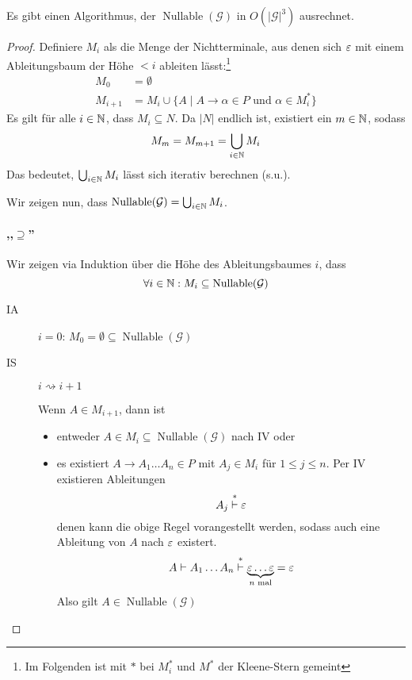 \begin{Satz}
  Es gibt einen Algorithmus, der $\operatorname{Nullable}(\mathcal{G})$ in $O(|\mathcal{G}|^3)$ ausrechnet.
\end{Satz}
\begin{proof}
  Definiere $M_i$ als die Menge der Nichtterminale, aus denen sich
  $\varepsilon$ mit einem Ableitungsbaum der Höhe $< i$ ableiten lässt:\footnote{
  Im Folgenden ist mit $*$ bei $M_i^*$ und $M^*$ der Kleene-Stern gemeint} 
  \begin{align*}
    M_0 &= \emptyset \\
    M_{i+1} &= M_i \cup \{ A \mid A \to \alpha \in P \text{ und }
              \alpha \in M_i^* \}
  \end{align*}
  Es gilt für alle $i \in \mathbb{N}$, dass $M_i \subseteq N$.
  Da $|N|$ endlich ist, existiert ein $m \in \mathbb{N}$, sodass
  \begin{displaymath}
    M_m = M_{m+1} = \bigcup_{i \in \mathbb{N}} M_i
  \end{displaymath}
  Das bedeutet, $\bigcup_{i \in \mathbb{N}} M_i$ lässt sich iterativ berechnen (s.u.).

  Wir zeigen nun, dass $\operatorname{Nullable}(\mathcal{G}) = \bigcup_{i \in \mathbb{N}} M_i$.

  \paragraph{,,$\supseteq$''} Wir zeigen via Induktion über die Höhe des Ableitungsbaumes $i$, dass 
  $$\forall i \in \mathbb{N}: M_i \subseteq \operatorname{Nullable}(\mathcal{G})$$
  \begin{description}
  \item[IA] $i = 0$: $M_0 = \emptyset \subseteq \operatorname{Nullable}(\mathcal{G})$
  \item[IS] $i \rightsquigarrow i+1$

    Wenn $A \in M_{i+1}$, dann ist
    \begin{itemize}
    \item entweder
      $A \in M_i \subseteq \operatorname{Nullable}(\mathcal{G})$ nach
      IV oder
    \item 
      es existiert $A \to A_1\ldots A_n \in P$ mit $A_j \in M_i$ für
      $1 \le j \le n$.
      Per IV existieren Ableitungen
      \begin{displaymath}
        A_j \stackrel{*}{\vdash} \varepsilon
      \end{displaymath}
      denen kann die obige Regel vorangestellt werden, sodass auch
      eine Ableitung von $A$ nach $\varepsilon$ existert.
      \begin{displaymath}
        A  \vdash A_1 \ldots A_n \stackrel{*}{\vdash} \underbrace{\varepsilon \ldots \varepsilon}_{n \text{ mal}} = \varepsilon
      \end{displaymath}
      Also gilt $A \in \operatorname{Nullable}(\mathcal{G})$
    \end{itemize}
  \end{description}


\end{proof}
